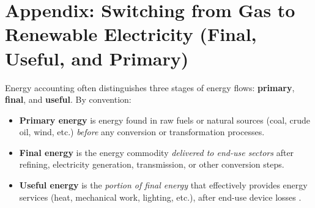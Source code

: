 \documentclass[11pt]{article}
\begin{document}
\begin{abstract}
    Under consistent input--output national accounting (with fixed shares $a_{ji}$), partial substitution of gas-based electricity by renewables in manufacturing does not alter aggregate TFP growth, regardless of whether energy flows are measured in final, useful, or primary form. 
    Using the $\zeta$-framework created in this paper, considering primary, final or useful energy does not change  TFP growth - except when primary energy is analysed within a broad energy sector that includes both electricity and fossil fuels.
Except for this one case: electrification and the switch from fossil to renewables has no impact on productivity
\[
   \hat{A}=0.
\]

In the CCC approach we are unfortunately in the ``exception'' case where a single energy sector sells both MWh of primary fossil fuel and electricity (both from renewables and fossil fuel). \textbf{This is why the best approach is to use useful energy.}
\end{abstract}




\section{Appendix: Switching from Gas to Renewable Electricity (Final, Useful, and Primary)}
\label{appendix_gas_renewables}

Energy accounting often distinguishes three stages of energy flows: \textbf{primary}, \textbf{final}, and \textbf{useful}. By convention:

\begin{itemize} \item \textbf{Primary energy} is energy found in raw fuels or natural sources (coal, crude oil, wind, etc.) \emph{before} any conversion or transformation processes. \item \textbf{Final energy} is the energy commodity \emph{delivered to end-use sectors} after refining, electricity generation, transmission, or other conversion steps. \item \textbf{Useful energy} is the \emph{portion of final energy} that effectively provides energy services (heat, mechanical work, lighting, etc.), after end-use device losses \citep{wayEmpiricallyGroundedTechnology2022}. \end{itemize}
\end{document}
